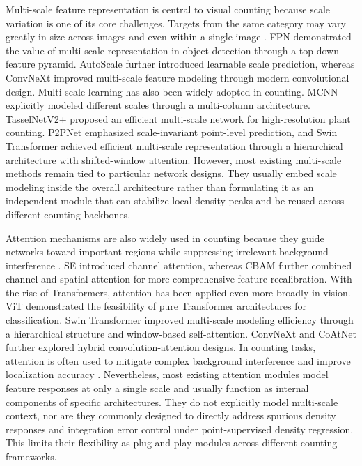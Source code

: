 \documentclass[a4paper,fleqn]{cas-sc}
\begin{document}
	Multi-scale feature representation is central to visual counting because scale variation is one of its core challenges. Targets from the same category may vary greatly in size across images and even within a single image \cite{ref37}. FPN \cite{ref26} demonstrated the value of multi-scale representation in object detection through a top-down feature pyramid. AutoScale \cite{ref37} further introduced learnable scale prediction, whereas ConvNeXt \cite{ref42} improved multi-scale feature modeling through modern convolutional design. Multi-scale learning has also been widely adopted in counting. MCNN \cite{ref20} explicitly modeled different scales through a multi-column architecture. TasselNetV2+ \cite{ref43} proposed an efficient multi-scale network for high-resolution plant counting. P2PNet \cite{ref36} emphasized scale-invariant point-level prediction, and Swin Transformer \cite{ref44} achieved efficient multi-scale representation through a hierarchical architecture with shifted-window attention. However, most existing multi-scale methods remain tied to particular network designs. They usually embed scale modeling inside the overall architecture rather than formulating it as an independent module that can stabilize local density peaks and be reused across different counting backbones.
	
	Attention mechanisms are also widely used in counting because they guide networks toward important regions while suppressing irrelevant background interference \cite{ref45,ref46}. SE \cite{ref29} introduced channel attention, whereas CBAM \cite{ref27} further combined channel and spatial attention for more comprehensive feature recalibration. With the rise of Transformers, attention has been applied even more broadly in vision. ViT \cite{ref47} demonstrated the feasibility of pure Transformer architectures for classification. Swin Transformer \cite{ref44} improved multi-scale modeling efficiency through a hierarchical structure and window-based self-attention. ConvNeXt \cite{ref42} and CoAtNet \cite{ref48} further explored hybrid convolution-attention designs. In counting tasks, attention is often used to mitigate complex background interference and improve localization accuracy \cite{ref23,ref49}. Nevertheless, most existing attention modules model feature responses at only a single scale and usually function as internal components of specific architectures. They do not explicitly model multi-scale context, nor are they commonly designed to directly address spurious density responses and integration error control under point-supervised density regression. This limits their flexibility as plug-and-play modules across different counting frameworks.
	
\end{document}
